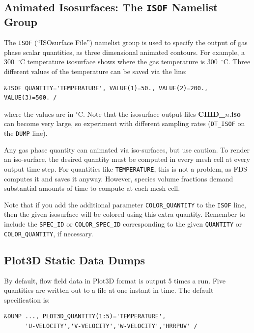 \documentclass[11pt]{book}
\newcommand{\ct}{\tt\small}
\begin{document}
\subsection{Animated Isosurfaces: The \texorpdfstring{{\tt ISOF}}{ISOF} Namelist Group}
\label{info:ISOF}

The {\ct ISOF} (``ISOsurface File'') namelist group is used to specify the output of
gas phase scalar quantities, as three dimensional animated contours.
For example, a 300~$^\circ$C temperature isosurface shows where the gas temperature is
300~$^\circ$C.
Three different values of the temperature can be saved via the line:

\footnotesize
\begin{verbatim}
&ISOF QUANTITY='TEMPERATURE', VALUE(1)=50., VALUE(2)=200., VALUE(3)=500. /
\end{verbatim}
\normalsize

\noindent
where the values are in $^\circ$C. Note that the isosurface output
files {\bf CHID\_$n$.iso} can become very large, so experiment with different sampling rates ({\ct DT\_ISOF} on the {\ct DUMP} line).


Any gas phase quantity can animated via iso-surfaces, but use caution. To render an iso-surface, the desired quantity must be
computed in every mesh cell at every output time step. For quantities like {\ct TEMPERATURE}, this is not a problem, as FDS computes it and saves it
anyway. However, species volume fractions demand substantial amounts of time to compute at each mesh cell.

Note that if you add the additional parameter {\ct COLOR\_QUANTITY} to the {\ct ISOF} line, then the given isosurface will be colored using
this extra quantity. Remember to include the {\ct SPEC\_ID} or {\ct COLOR\_SPEC\_ID} corresponding to the given {\ct QUANTITY} or
{\ct COLOR\_QUANTITY}, if necessary.




\subsection{Plot3D Static Data Dumps}
\label{info:PL3D}

By default, flow field data in Plot3D format is output 5 times a run.
Five quantities are written out to a file at one instant in time. The default specification is:

\footnotesize
\begin{verbatim}
&DUMP ..., PLOT3D_QUANTITY(1:5)='TEMPERATURE',
      'U-VELOCITY','V-VELOCITY','W-VELOCITY','HRRPUV' /
\end{verbatim}
\normalsize
\end{document}
